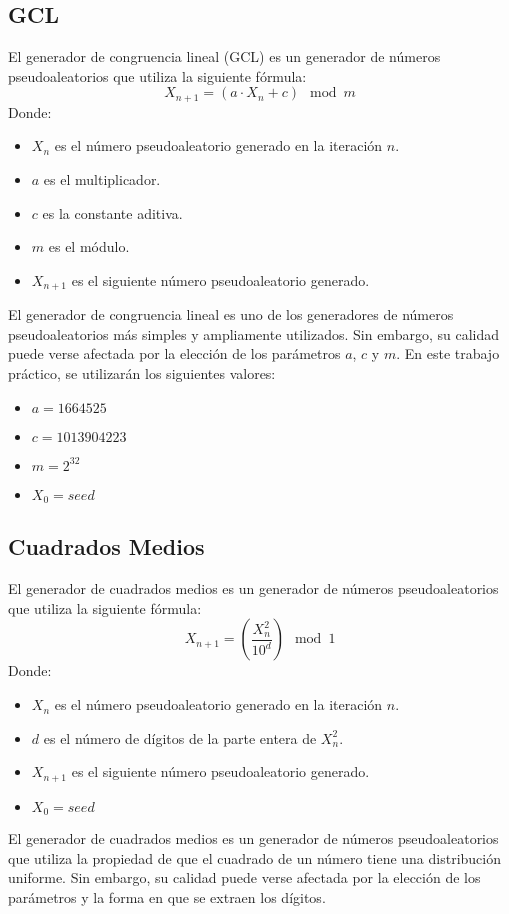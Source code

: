 \documentclass{article}
\begin{document}
\subsection{GCL}
El generador de congruencia lineal (GCL) es un generador de números pseudoaleatorios que utiliza la siguiente fórmula:
\begin{equation}
    X_{n+1} = (a \cdot X_n + c) \mod m
\end{equation}
Donde:
\begin{itemize}
    \item $X_n$ es el número pseudoaleatorio generado en la iteración $n$.
    \item $a$ es el multiplicador.
    \item $c$ es la constante aditiva.
    \item $m$ es el módulo.
    \item $X_{n+1}$ es el siguiente número pseudoaleatorio generado.
\end{itemize}
El generador de congruencia lineal es uno de los generadores de números pseudoaleatorios más simples y ampliamente utilizados. Sin embargo, su calidad puede verse afectada por la elección de los parámetros $a$, $c$ y $m$. En este trabajo práctico, se utilizarán los siguientes valores:
\begin{itemize}
    \item $a = 1664525$
    \item $c = 1013904223$
    \item $m = 2^{32}$
    \item $X_0 = seed$
\end{itemize}
\subsection{Cuadrados Medios}
El generador de cuadrados medios es un generador de números pseudoaleatorios que utiliza la siguiente fórmula:
\begin{equation}
    X_{n+1} = \left( \frac{X_n^2}{10^{d}} \right) \mod 1
\end{equation}
Donde:
\begin{itemize}
    \item $X_n$ es el número pseudoaleatorio generado en la iteración $n$.
    \item $d$ es el número de dígitos de la parte entera de $X_n^2$.
    \item $X_{n+1}$ es el siguiente número pseudoaleatorio generado.
    \item $X_0 = seed$
\end{itemize}
El generador de cuadrados medios es un generador de números pseudoaleatorios que utiliza la propiedad de que el cuadrado de un número tiene una distribución uniforme. Sin embargo, su calidad puede verse afectada por la elección de los parámetros y la forma en que se extraen los dígitos.
\end{document}
